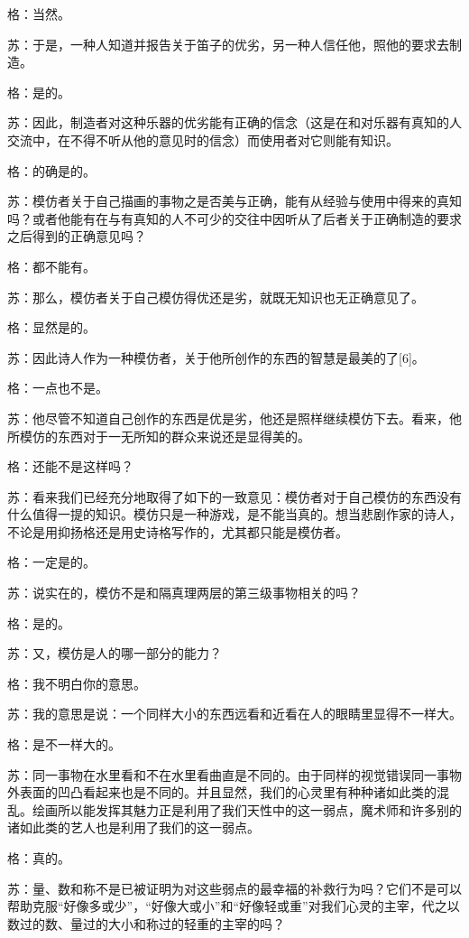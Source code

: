 \documentclass[12pt,oneside]{book}
\begin{document}
格：当然。

苏：于是，一种人知道并报告关于笛子的优劣，另一种人信任他，照他的要求去制造。

格：是的。

苏：因此，制造者对这种乐器的优劣能有正确的信念（这是在和对乐器有真知的人交流中，在不得不听从他的意见时的信念）而使用者对它则能有知识。

格：的确是的。

苏：模仿者关于自己描画的事物之是否美与正确，能有从经验与使用中得来的真知吗？或者他能有在与有真知的人不可少的交往中因听从了后者关于正确制造的要求之后得到的正确意见吗？

格：都不能有。

苏：那么，模仿者关于自己模仿得优还是劣，就既无知识也无正确意见了。

格：显然是的。

苏：因此诗人作为一种模仿者，关于他所创作的东西的智慧是最美的了[6]。

格：一点也不是。

苏：他尽管不知道自己创作的东西是优是劣，他还是照样继续模仿下去。看来，他所模仿的东西对于一无所知的群众来说还是显得美的。

格：还能不是这样吗？

苏：看来我们已经充分地取得了如下的一致意见：模仿者对于自己模仿的东西没有什么值得一提的知识。模仿只是一种游戏，是不能当真的。想当悲剧作家的诗人，不论是用抑扬格还是用史诗格写作的，尤其都只能是模仿者。

格：一定是的。

苏：说实在的，模仿不是和隔真理两层的第三级事物相关的吗？

格：是的。

苏：又，模仿是人的哪一部分的能力？

格：我不明白你的意思。

苏：我的意思是说：一个同样大小的东西远看和近看在人的眼睛里显得不一样大。

格：是不一样大的。

苏：同一事物在水里看和不在水里看曲直是不同的。由于同样的视觉错误同一事物外表面的凹凸看起来也是不同的。并且显然，我们的心灵里有种种诸如此类的混乱。绘画所以能发挥其魅力正是利用了我们天性中的这一弱点，魔术师和许多别的诸如此类的艺人也是利用了我们的这一弱点。

格：真的。

苏：量、数和称不是已被证明为对这些弱点的最幸福的补救行为吗？它们不是可以帮助克服“好像多或少”，“好像大或小”和“好像轻或重”对我们心灵的主宰，代之以数过的数、量过的大小和称过的轻重的主宰的吗？
\end{document}
